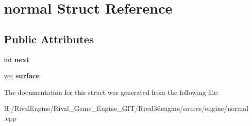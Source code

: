 \hypertarget{structnormal}{}\section{normal Struct Reference}
\label{structnormal}
\subsection*{Public Attributes}
\begin{DoxyCompactItemize}
\item 
\mbox{\label{structnormal_a4d7b2ee41f27c2793b7b7387ac72128e}} 
int {\bfseries next}
\item 
\mbox{\label{structnormal_a8bac3316601358eceb7a5e75d95f933c}} 
\hyperlink{structvec}{vec} {\bfseries surface}
\end{DoxyCompactItemize}


The documentation for this struct was generated from the following file\+:\begin{DoxyCompactItemize}
\item 
H\+:/\+Rival\+Engine/\+Rival\+\_\+\+Game\+\_\+\+Engine\+\_\+\+G\+I\+T/\+Rival3dengine/source/engine/normal.\+cpp\end{DoxyCompactItemize}
